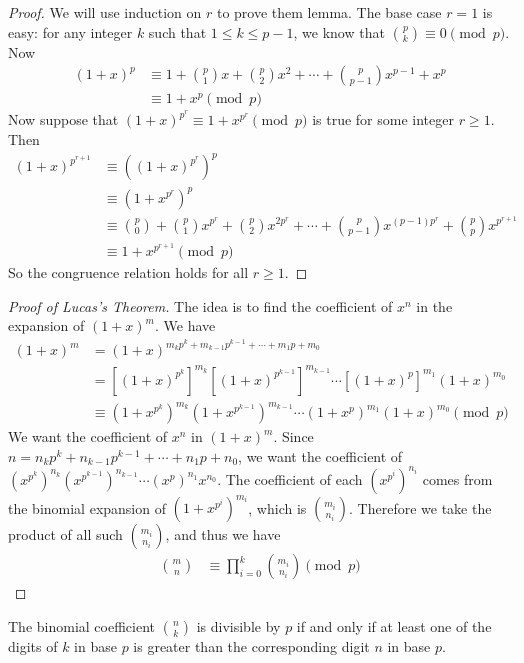 \documentclass[12pt]{subfile}
\begin{document}
	\begin{proof}
		We will use induction on $r$ to prove them lemma. The base case $r=1$ is easy: for any integer $k$ such that $1 \leq k \leq p-1$, we know that $\binom{p}{k} \equiv 0 \pmod p$. Now
			\begin{align*}
				(1+x)^p
					& \equiv 1+\binom{p}{1}x+\binom{p}{2}x^2+\cdots+\binom{p}{p-1}x^{p-1}+x^p\\
					& \equiv 1+x^p\pmod p
			\end{align*}
		Now suppose that $(1+x)^{p^r}\equiv 1+x^{p^r}\pmod{p}$ is true for some integer $r \geq 1$. Then
			\begin{align*}
				(1+x)^{p^{r+1}}
					&\equiv\left((1+x)^{p^r}\right)^p\\
					& \equiv\left(1+x^{p^r}\right)^p\\
					& \equiv\binom{p}{0}+\binom{p}{1}x^{p^r}+\binom{p}{2}x^{2p^r}+\cdots+\binom{p}{p-1}x^{(p-1)p^r}+\binom{p}{p}x^{p^{r+1}}\\
					& \equiv 1+x^{p^{r+1}}\pmod{p}
			\end{align*}
		So the congruence relation holds for all $r \geq 1$.
	\end{proof}

	\begin{proof}[Proof of Lucas's Theorem]
		The idea is to find the coefficient of $x^n$ in the expansion of $(1+x)^m$. We have
			\begin{align*}
				(1+x)^m
					&=(1+x)^{m_kp^k+m_{k-1}p^{k-1}+\cdots+m_1p+m_0}\\
					&=[(1+x)^{p^k}]^{m_k}[(1+x)^{p^{k-1}}]^{m_{k-1}}\cdots[(1+x)^p]^{m_1}(1+x)^{m_0}\\ &\equiv(1+x^{p^k})^{m_k}(1+x^{p^{k-1}})^{m_{k-1}}\cdots(1+x^p)^{m_1}(1+x)^{m_0}\pmod{p}
			\end{align*}
		We want the coefficient of $x^n$ in $(1+x)^m$. Since $n=n_kp^k+n_{k-1}p^{k-1}+\cdots +n_1p+n_0$, we want the coefficient of $(x^{p^{k}})^{n_{k}}(x^{p^{k-1}})^{n_{k-1}}\cdots (x^p)^{n_1}x^{n_0}$.
		The coefficient of each $(x^{p^{i}})^{n_{i}}$ comes from the binomial expansion of $(1+x^{p^i})^{m_i}$, which is $\binom{m_i}{n_i}$. Therefore we take the product of all such $\binom{m_i}{n_i}$, and thus we have
			\begin{align*}
				\binom{m}{n}
					& \equiv\prod_{i=0}^{k}\binom{m_i}{n_i}\pmod{p}
			\end{align*}
	\end{proof}

	\begin{corollary}\label{cor:binomdiv}
		The binomial coefficient $\binom{n}{k}$ is divisible by $p$ if and only if at least one of the digits of $k$ in base $p$ is greater than the corresponding digit $n$ in base $p$.
	\end{corollary}
\end{document}
